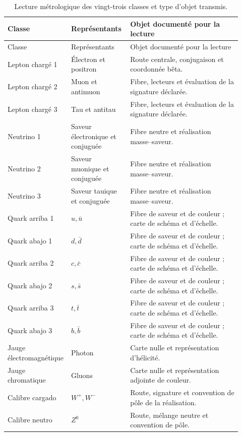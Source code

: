 \begingroup
\small
\setlength{\tabcolsep}{3pt}
\begin{longtable}{p{0.20\linewidth}p{0.25\linewidth}p{0.47\linewidth}}
\caption{Lecture métrologique des vingt-trois classes et type d’objet transmis.}
\label{vi:tab:vi-clases-metrologia}\\
\toprule
Classe & Représentants & Objet documenté pour la lecture\\
\midrule
\endfirsthead
\toprule
Classe & Représentants & Objet documenté pour la lecture\\
\midrule
\endhead
\bottomrule
\endfoot
Lepton chargé 1 & Électron et positron & Route centrale, conjugaison et coordonnée bêta.\\
Lepton chargé 2 & Muon et antimuon & Fibre, lecteurs et évaluation de la signature déclarée.\\
Lepton chargé 3 & Tau et antitau & Fibre, lecteurs et évaluation de la signature déclarée.\\
Neutrino 1
 & Saveur électronique et conjuguée & Fibre neutre et réalisation masse--saveur.\\
Neutrino 2
 & Saveur muonique et conjuguée & Fibre neutre et réalisation masse--saveur.\\
Neutrino 3
 & Saveur tauique et conjuguée & Fibre neutre et réalisation masse--saveur.\\
Quark arriba 1 & \(u,\bar u\) & Fibre de saveur et de couleur ; carte de schéma et d'échelle.\\
Quark abajo 1 & \(d,\bar d\) & Fibre de saveur et de couleur ; carte de schéma et d'échelle.\\
Quark arriba 2 & \(c,\bar c\) & Fibre de saveur et de couleur ; carte de schéma et d'échelle.\\
Quark abajo 2 & \(s,\bar s\) & Fibre de saveur et de couleur ; carte de schéma et d'échelle.\\
Quark arriba 3 & \(t,\bar t\) & Fibre de saveur et de couleur ; carte de schéma et d'échelle.\\
Quark abajo 3 & \(b,\bar b\) & Fibre de saveur et de couleur ; carte de schéma et d'échelle.\\
Jauge électromagnétique & Photon & Carte nulle et représentation d'hélicité.\\
Jauge chromatique & Gluons & Carte nulle et représentation adjointe de couleur.\\
Calibre cargado & \(W^+,W^-\) & Route, signature et convention de pôle de la réalisation.\\
Calibre neutro & \(Z^0\) & Route, mélange neutre et convention de pôle.\\

\end{longtable}
